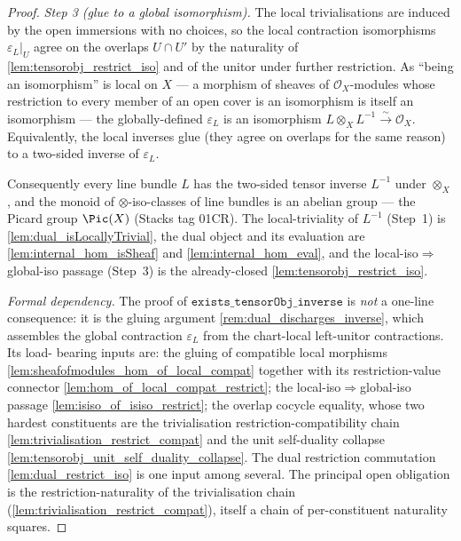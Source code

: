 \begin{proof}
  \emph{Step 3 (glue to a global isomorphism).} The local trivialisations are induced
  by the open immersions with no choices, so the local contraction isomorphisms
  \(\varepsilon_L|_U\) agree on the overlaps \(U \cap U'\) by the naturality of
  \cref{lem:tensorobj_restrict_iso} and of the unitor under further restriction. As
  ``being an isomorphism'' is local on \(X\) --- a morphism of sheaves of
  \(\mathcal{O}_X\)-modules whose restriction to every member of an open cover is an
  isomorphism is itself an isomorphism --- the globally-defined \(\varepsilon_L\) is an
  isomorphism \(L \otimes_X L^{-1} \xrightarrow{\sim} \mathcal{O}_X\). Equivalently, the
  local inverses glue (they agree on overlaps for the same reason) to a two-sided
  inverse of \(\varepsilon_L\).

  Consequently every line bundle \(L\) has the two-sided tensor inverse \(L^{-1}\)
  under \(\otimes_X\), and the monoid of \(\otimes\)-iso-classes of line bundles is
  an abelian group --- the Picard group \(\Pic(X)\) (Stacks tag 01CR). The
  local-triviality of \(L^{-1}\) (Step~1) is \cref{lem:dual_isLocallyTrivial}, the
  dual object and its evaluation are \cref{lem:internal_hom_isSheaf} and
  \cref{lem:internal_hom_eval}, and the local-iso\(\Rightarrow\)global-iso passage
  (Step~3) is the already-closed \cref{lem:tensorobj_restrict_iso}.

  \emph{Formal dependency.} The proof of
  \(\mathtt{exists\_tensorObj\_inverse}\) is \emph{not} a one-line consequence: it is
  the gluing argument \cref{rem:dual_discharges_inverse}, which assembles the global
  contraction \(\varepsilon_L\) from the chart-local left-unitor contractions. Its load-
  bearing inputs are: the gluing of compatible local morphisms
  \cref{lem:sheafofmodules_hom_of_local_compat} together with its restriction-value
  connector \cref{lem:hom_of_local_compat_restrict}; the local-iso\(\Rightarrow\)global-iso
  passage \cref{lem:isiso_of_isiso_restrict}; the overlap cocycle equality, whose two
  hardest constituents are the trivialisation restriction-compatibility chain
  \cref{lem:trivialisation_restrict_compat} and the unit self-duality collapse
  \cref{lem:tensorobj_unit_self_duality_collapse}. The dual restriction commutation
  \cref{lem:dual_restrict_iso} is one input among several. The principal open obligation is
  the restriction-naturality of the trivialisation chain
  (\cref{lem:trivialisation_restrict_compat}), itself a chain of per-constituent naturality
  squares.
\end{proof}

